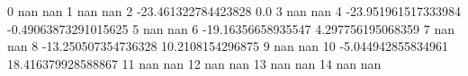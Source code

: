 0 nan nan
1 nan nan
2 -23.461322784423828 0.0
3 nan nan
4 -23.951961517333984 -0.49063873291015625
5 nan nan
6 -19.16356658935547 4.297756195068359
7 nan nan
8 -13.250507354736328 10.2108154296875
9 nan nan
10 -5.044942855834961 18.416379928588867
11 nan nan
12 nan nan
13 nan nan
14 nan nan
